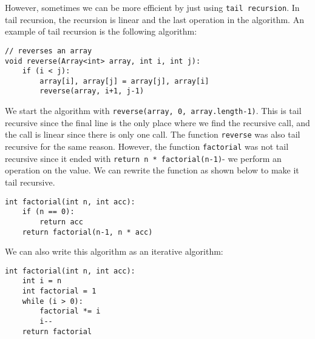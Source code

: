 \documentclass[a4paper, openany]{memoir}
\begin{document}
\noindent However, sometimes we can be more efficient by just using \texttt{tail recursion}. In tail recursion, the recursion is linear and the last operation in the algorithm. An example of tail recursion is the following algorithm:
\begin{lstlisting}[language=pseudocode]
// reverses an array
void reverse(Array<int> array, int i, int j):
    if (i < j):
        array[i], array[j] = array[j], array[i]
        reverse(array, i+1, j-1)
\end{lstlisting}
We start the algorithm with \texttt{reverse(array, 0, array.length-1)}. This is tail recursive since the final line is the only place where we find the recursive call, and the call is linear since there is only one call. The function \texttt{reverse} was also tail recursive for the same reason. However, the function \texttt{factorial} was not tail recursive since it ended with \texttt{return n * factorial(n-1)}- we perform an operation on the value. We can rewrite the function as shown below to make it tail recursive.
\begin{lstlisting}[language=pseudocode]
int factorial(int n, int acc):
    if (n == 0):
        return acc
    return factorial(n-1, n * acc)
\end{lstlisting}
We can also write this algorithm as an iterative algorithm:
\begin{lstlisting}[language=pseudocode]
int factorial(int n, int acc):
    int i = n
    int factorial = 1
    while (i > 0):
        factorial *= i
        i--
    return factorial
\end{lstlisting}
\end{document}
